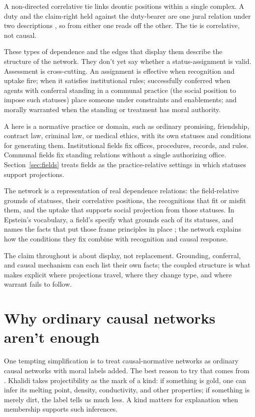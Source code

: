 \documentclass[12pt]{article}
\begin{document}
A non-directed correlative tie links deontic positions within a single complex. A duty and the claim-right held against the duty-bearer are one jural relation under two descriptions \citep{hohfeld1913SomeFundamental}, so from either one reads off the other. The tie is correlative, not causal.

These types of dependence and the edges that display them describe the structure of the network. They don't yet say whether a status-assignment is valid. Assessment is cross-cutting. An assignment is effective when recognition and uptake fire;  when it satisfies institutional rules; successfully conferred when agents with conferral standing in a communal practice (the social position to impose such statuses) place someone under constraints and enablements; and morally warranted when the standing or treatment has moral authority.

A  here is a normative practice or domain, such as ordinary promising, friendship, contract law, criminal law, or medical ethics, with its own statuses and conditions for generating them. Institutional fields fix offices, procedures, records, and rules. Communal fields fix standing relations without a single authorizing office. Section~\ref{sec:fields} treats fields as the practice-relative settings in which statuses support projections.

The network is a representation of real dependence relations: the field-relative grounds of statuses, their correlative positions, the recognitions that fit or misfit them, and the uptake that supports social projection from those statuses. In Epstein's vocabulary, a field's  specify what grounds each of its statuses, and  names the facts that put those frame principles in place \citep{epstein2015AntTrap}; the network explains how the conditions they fix combine with recognition and causal response.

The claim throughout is about display, not replacement. Grounding, conferral, and causal mechanism can each list their own facts; the coupled structure is what makes explicit where projections travel, where they change type, and where warrant fails to follow.

\section{Why ordinary causal networks aren't enough}
\label{sec:causal-not-enough}

One tempting simplification is to treat causal-normative networks as ordinary causal networks with moral labels added. The best reason to try that comes from \textcite{khalidi2018nodes}. Khalidi takes projectibility as the mark of a kind: if something is gold, one can infer its melting point, density, conductivity, and other properties; if something is merely dirt, the label tells us much less. A kind matters for explanation when membership supports such inferences.
\end{document}
